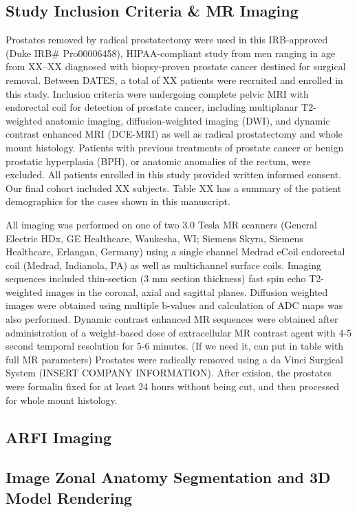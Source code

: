 \subsection{Study Inclusion Criteria \& MR Imaging}
Prostates removed by radical prostatectomy were used in this IRB-approved (Duke
IRB\# Pro00006458), HIPAA-compliant study from men ranging in age from XX--XX
diagnosed with biopsy-proven prostate cancer destined for surgical removal.
Between DATES, a total of XX patients were recruited and enrolled in this
study. Inclusion criteria were undergoing complete pelvic MRI with endorectal
coil for detection of prostate cancer, including multiplanar T2-weighted
anatomic imaging, diffusion-weighted imaging (DWI), and dynamic contrast
enhanced MRI (DCE-MRI) as well as radical prostatectomy and whole mount
histology. Patients with previous treatments of prostate cancer or benign
prostatic hyperplasia (BPH), or anatomic anomalies of the rectum, were
excluded.  All patients enrolled in this study provided written informed
consent. Our final cohort included XX subjects. Table XX has a summary of the
patient demographics for the cases shown in this manuscript.  

All imaging was performed on one of two 3.0 Tesla MR scanners (General Electric
HDx, GE Healthcare, Waukesha, WI;  Siemens Skyra, Siemens Healthcare, Erlangan,
Germany) using a single channel Medrad eCoil endorectal coil (Medrad,
Indianola, PA) as well as multichannel surface coils.  Imaging sequences
included thin-section (3 mm section thickness) fast spin echo T2-weighted
images in the coronal, axial and sagittal planes.  Diffusion weighted images
were obtained using multiple b-values and calculation of ADC maps was also
performed.  Dynamic contrast enhanced MR sequences were obtained after
administration of a weight-based dose of extracellular MR contrast agent with
4-5 second temporal resolution for 5-6 minutes. (If we need it, can put in
table with full MR parameters) Prostates were radically removed using a da
Vinci Surgical System (INSERT COMPANY INFORMATION).  After exision, the
prostates were formalin fixed for at least 24 hours without being cut, and then
processed for whole mount histology.

\subsection{ARFI Imaging}

\subsection{Image Zonal Anatomy Segmentation and 3D Model Rendering}
